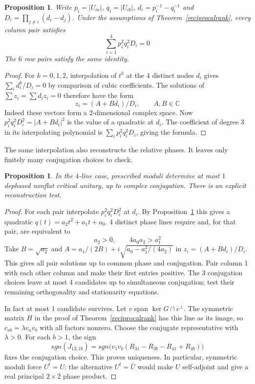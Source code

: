 \documentclass[11pt,a4paper]{article}
\newtheorem{prop}[thm]{Proposition}
\begin{document}
\begin{prop}\label{pairequation}
Write $p_i=|U_{ia}|$, $q_i=|U_{ib}|$, $d_i=p_i^{-1}-q_i^{-1}$ and
$D_i=\prod_{j\ne i}(d_i-d_j)$. Under the assumptions of
Theorem~\ref{reciprocalrank}, every column pair satisfies
\[
 \sum_{i=1}^4 p_i^2 q_i^2 D_i=0
\]
The $6$ row pairs satisfy the same identity.
\end{prop}
\begin{proof}
For $k=0,1,2$, interpolation of $t^k$ at the 4 distinct nodes $d_i$
gives $\sum_i d_i^k/D_i=0$ by comparison of cubic coefficients.
The solutions of $\sum z_i=\sum d_i z_i=0$ therefore have the form
\[
 z_i=(A+B d_i)/D_i,\qquad A,B\in\mathbb C
\]
Indeed these vectors form a 2-dimensional complex space.
Now $p_i^2q_i^2D_i^2=|A+B d_i|^2$ is the value of a quadratic at $d_i$.
The coefficient of degree 3 in its interpolating polynomial is
$\sum_i p_i^2q_i^2D_i$, giving the formula.
\end{proof}

The same interpolation also reconstructs the relative phases.
It leaves only finitely many conjugation choices to check.

\begin{prop}\label{phaseuniqueness}
In the $4$-line case, prescribed moduli determine at most $1$ dephased
nonflat critical unitary, up to complex conjugation. There is an explicit
reconstruction test.
\end{prop}
\begin{proof}
For each pair interpolate $p_i^2q_i^2D_i^2$ at $d_i$. By
Proposition~\ref{pairequation} this gives a quadratic
$q(t)=a_2t^2+a_1t+a_0$. 4 distinct phase lines require and, for that
pair, are equivalent to
\[
 a_2>0,\qquad 4a_0a_2>a_1^2
\]
Take $B=\sqrt{a_2}$ and
$A=a_1/(2B)+i\sqrt{a_0-a_1^2/(4a_2)}$ in $z_i=(A+Bd_i)/D_i$.
This gives all pair solutions up to common phase and conjugation.
Pair column 1 with each other column and make their first entries
positive. The 3 conjugation choices leave at most 4 candidates
up to simultaneous conjugation; test their remaining orthogonality and
stationarity equations.

In fact at most 1 candidate survives. Let $v$ span
$\ker G\cap e^\perp$. The symmetric matrix $H$ in the proof of
Theorem~\ref{reciprocalrank} has this line as its image, so
$c_{ab}=\lambda v_av_b$ with all factors nonzero. Choose the conjugate
representative with $\lambda>0$. For each $b>1$, the sign
\[
 sgn(J_{12,1b})
 =sgn\big(v_1v_b(R_{31}-R_{3b}-R_{41}+R_{4b})\big)
\]
fixes the conjugation choice. This proves uniqueness. In particular,
symmetric moduli force $U^t=U$: the alternative $U^t=\bar U$ would make
$U$ self-adjoint and give a real principal $2\times2$ phase product.
\end{proof}
\end{document}
